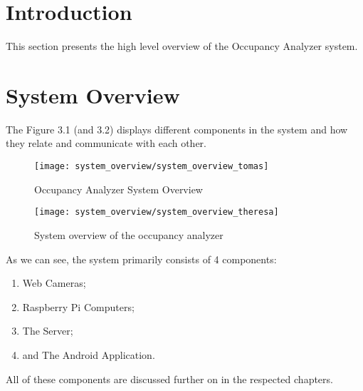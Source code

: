 \section{Introduction}
This section presents the high level overview of the Occupancy Analyzer system.

\section{System Overview}
The Figure 3.1 (and 3.2) displays different components in the system and how they relate and communicate with each other.

\begin{figure}[ht]
	\begin{center}
	\texttt{[image: system\_overview/system\_overview\_tomas]}
	\caption{Occupancy Analyzer System Overview}
	\end{center}
\end{figure}

\begin{figure}[ht]
	\begin{center}
	\texttt{[image: system\_overview/system\_overview\_theresa]}
	\caption{System overview of the occupancy analyzer}
	\end{center}
\end{figure}

As we can see, the system primarily consists of 4 components:

\begin{enumerate}
	\item Web Cameras;
	\item Raspberry Pi Computers;
	\item The Server;
	\item and The Android Application.
\end{enumerate}

All of these components are discussed further on in the respected chapters.


